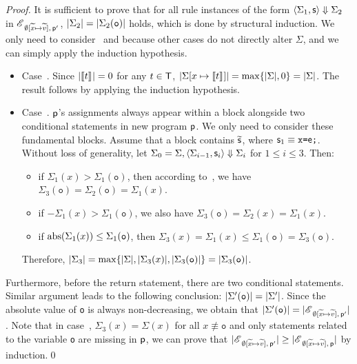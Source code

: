 \documentclass[runningheads]{llncs}
\begin{document}
\begin{proof}
It is sufficient to prove that for all rule instances of the form
$\langle\Sigma_1,\mathsf{s}\rangle\Downarrow{\Sigma_2}$ in $\mathscr{E}_{\;\emptyset[\widetilde{x}\mapsto{\widetilde{v}}],\,\mathsf{p}'}$, $\vert\Sigma_2\vert=\vert\Sigma_2(\texttt{o})\vert$ holds, which is done by structural induction.
We only need to consider~ and  because other cases do not directly alter $\Sigma$, and we can simply apply the induction hypothesis.
\begin{itemize}
    \item Case~. Since $\vert\llbracket t\rrbracket_{}\vert=0$ for any $t\in\mathsf{T}$, $\vert\Sigma[x\mapsto\llbracket t\rrbracket_{}]\vert=\max\{\vert\Sigma\vert,0\}=\vert\Sigma\vert$.
    The result follows by applying the induction hypothesis.
    \item Case~.
    $\mathsf{p}$'s assignments always appear within a block alongside two conditional statements in new program $\mathsf{p}$.
    We only need to consider these fundamental blocks.
    Assume that a block contains $\widetilde{\mathsf{s}}$, where $\mathsf{s}_1 \equiv \texttt{x=$\mathsf{e}$;}$.
    Without loss of generality, let $\Sigma_0 = \Sigma, \langle\Sigma_{i-1},\mathsf{s}_i\rangle\Downarrow{\Sigma_i}$ for $1\le i\le 3$. Then:
    \begin{itemize}
        \item if $\Sigma_1(x)>\Sigma_1(\texttt{o})$, then according to~, we have $\Sigma_3(\texttt{o})=\Sigma_2(\texttt{o})=\Sigma_1(x)$.
        \item if $-\Sigma_1(x)>\Sigma_1(\texttt{o})$, we also have $\Sigma_3(\texttt{o})=\Sigma_2(x)=\Sigma_1(x)$.
        \item if $\mathrm{abs}(\Sigma_1(x))\le\Sigma_1(\texttt{o})$, then $\Sigma_3(x)=\Sigma_1(x)\le\Sigma_1(\texttt{o})=\Sigma_3(\texttt{o})$.
    \end{itemize}
    Therefore, $\vert\Sigma_3\vert=\max\{\vert\Sigma\vert,\vert\Sigma_3(x)\vert,\vert\Sigma_3(\texttt{o})\vert\}=\vert\Sigma_3(\texttt{o})\vert$.
\end{itemize}
Furthermore, before the return statement, there are two conditional statements.
Similar argument leads to the following conclusion: $\vert\Sigma'(\texttt{o})\vert=\vert\Sigma'\vert$.
Since the absolute value of \texttt{o} is always non-decreasing, we obtain that $\vert\Sigma'(\texttt{o})\vert=\vert\mathscr{E}_{\;\emptyset[\widetilde{x}\mapsto{\widetilde{v}}],\,\mathsf{p}'}\vert$.
Note that in case~, $\Sigma_3(x)=\Sigma(x)$ for all $x\not\equiv\texttt{o}$ and only statements related to the variable \texttt{o} are missing in $\mathsf{p}$, we can prove that $\vert\mathscr{E}_{\;\emptyset[\widetilde{x}\mapsto{\widetilde{v}}],\,\mathsf{p}'}\vert\ge\vert\mathscr{E}_{\;\emptyset[\widetilde{x}\mapsto{\widetilde{v}}],\,\mathsf{p}}\vert$ by induction.\qed
\end{proof}
\end{document}
